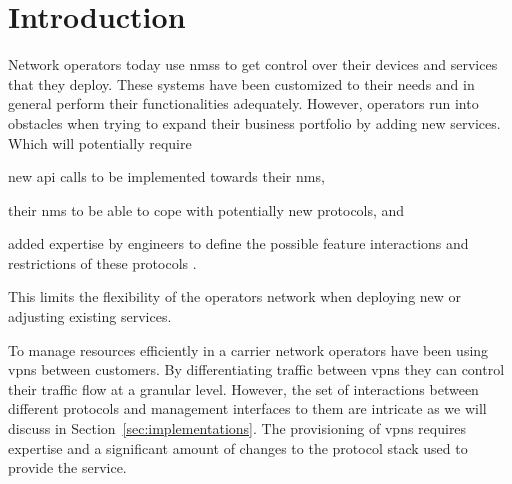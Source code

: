 \section{Introduction} %
\label{sec:introduction}
Network operators today use \acp{nms} to get control over their devices and services that they deploy. These systems have been customized to their needs and in general perform their functionalities adequately. However, operators run into obstacles when trying to expand their business portfolio by adding new services. Which will potentially require
\begin{inparaenum}
	\item new \ac{api} calls to be implemented towards their \ac{nms}, 
	\item their \ac{nms} to be able to cope with potentially new protocols, and
	\item added expertise by engineers to define the possible feature interactions and restrictions of these protocols \cite{programmability-answer}. 
\end{inparaenum}
This limits the flexibility of the operators network when deploying new or adjusting existing services.



To manage resources efficiently in a carrier network operators have been using \acp{vpn} between customers. By differentiating traffic between \acp{vpn} they can control their traffic flow at a granular level. However, the set of interactions between different protocols and management interfaces to them are intricate as we will discuss in Section~\ref{sec:implementations}. The provisioning of \acp{vpn} requires expertise and a significant amount of changes to the protocol stack used to provide the service. 

